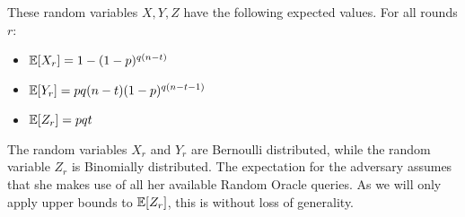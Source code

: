 These random variables $X, Y, Z$ have the following expected values. For all
rounds $r$:

\begin{itemize}
  \item $\operatorname{\mathbb{E}}[X_r] = 1 - (1 - p)^{q(n - t)}$
  \item $\operatorname{\mathbb{E}}[Y_r] = pq(n - t)(1 - p)^{q(n - t - 1)}$
  \item $\operatorname{\mathbb{E}}[Z_r] = pqt$
\end{itemize}

The random variables $X_r$ and $Y_r$ are Bernoulli distributed, while the
random variable $Z_r$ is Binomially distributed.
The expectation for the adversary assumes that she makes use of all
her available Random Oracle queries. As we will only apply upper bounds to
$\operatorname{\mathbb{E}}[Z_r]$, this is without loss of generality.
